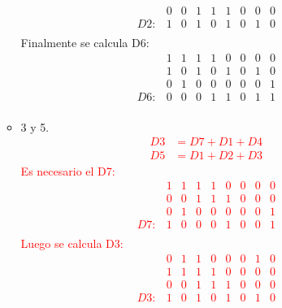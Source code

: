 \documentclass{templateNote}
\begin{document}
\begin{itemize}
\begin{itemize}
{\begin{equation*}
\begin{array}{ccccccccc}
                    & 0 & 0 & 1 & 1 & 1 & 0 & 0 & 0 \\ \hline
                D2: & 1 & 0 & 1 & 0 & 1 & 0 & 1 & 0 \\
                \end{array}
            \end{equation*}
            Finalmente se calcula D6:
            \begin{equation*}
                \begin{array}{ccccccccc}
                    & 1 & 1 & 1 & 1 & 0 & 0 & 0 & 0 \\
                    & 1 & 0 & 1 & 0 & 1 & 0 & 1 & 0 \\
                    & 0 & 1 & 0 & 0 & 0 & 0 & 0 & 1 \\ \hline
                D6: & 0 & 0 & 0 & 1 & 1 & 0 & 1 & 1 \\
                \end{array}
            \end{equation*}
        }
        \item 3 y 5.
        \textcolor{red}{
            \begin{align*}
                D3 &= D7 + D1 + D4 \\
                D5 &= D1 + D2 + D3
            \end{align*}
            Es necesario el D7:
            \begin{equation*}
                \begin{array}{ccccccccc}
                    & 1 & 1 & 1 & 1 & 0 & 0 & 0 & 0 \\
                    & 0 & 0 & 1 & 1 & 1 & 0 & 0 & 0 \\
                    & 0 & 1 & 0 & 0 & 0 & 0 & 0 & 1 \\ \hline
                D7: & 1 & 0 & 0 & 0 & 1 & 0 & 0 & 1 \\
                \end{array}
            \end{equation*}
            Luego se calcula D3:
            \begin{equation*}
                \begin{array}{ccccccccc}
                    & 0 & 1 & 1 & 0 & 0 & 0 & 1 & 0 \\
                    & 1 & 1 & 1 & 1 & 0 & 0 & 0 & 0 \\
                    & 0 & 0 & 1 & 1 & 1 & 0 & 0 & 0 \\ \hline
                D3: & 1 & 0 & 1 & 0 & 1 & 0 & 1 & 0 \\

\end{array}
\end{equation*}}
\end{itemize}
\end{itemize}
\end{document}
